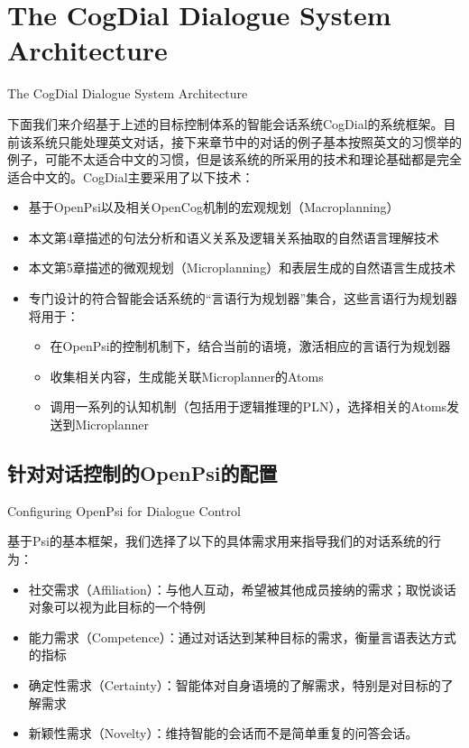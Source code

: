 \section{The CogDial Dialogue System Architecture}{The CogDial Dialogue System Architecture}

下面我们来介绍基于上述的目标控制体系的智能会话系统CogDial的系统框架。目前该系统只能处理英文对话，接下来章节中的对话的例子基本按照英文的习惯举的例子，可能不太适合中文的习惯，但是该系统的所采用的技术和理论基础都是完全适合中文的。CogDial主要采用了以下技术：

\begin{itemize}
\item  基于OpenPsi以及相关OpenCog机制的宏观规划（Macroplanning）
\item  本文第4章描述的句法分析和语义关系及逻辑关系抽取的自然语言理解技术
\item  本文第5章描述的微观规划（Microplanning）和表层生成的自然语言生成技术
\item  专门设计的符合智能会话系统的“言语行为规划器”集合，这些言语行为规划器将用于：
\begin{itemize}
    \item 在OpenPsi的控制机制下，结合当前的语境，激活相应的言语行为规划器
    \item 收集相关内容，生成能关联Microplanner的Atoms
    \item  调用一系列的认知机制（包括用于逻辑推理的PLN），选择相关的Atoms发送到Microplanner
\end{itemize}
\end{itemize}

\subsection{针对对话控制的OpenPsi的配置}{Configuring OpenPsi for Dialogue Control}

基于Psi的基本框架，我们选择了以下的具体需求用来指导我们的对话系统的行为：
\begin{itemize}
\item 社交需求（Affiliation）：与他人互动，希望被其他成员接纳的需求；取悦谈话对象可以视为此目标的一个特例
\item 能力需求（Competence）：通过对话达到某种目标的需求，衡量言语表达方式的指标
\item 确定性需求（Certainty）：智能体对自身语境的了解需求，特别是对目标的了解需求
\item 新颖性需求（Novelty）：维持智能的会话而不是简单重复的问答会话。
\end{itemize}

